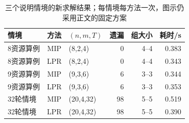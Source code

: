 \begin{table}[htbp]
\centering\small
\caption{三个说明情境的新求解结果；每情境每方法一次，图示仍采用正文的固定方案}\label{tab:special-timing}
\begin{tabular}{lclrrr}\toprule
情境 & 方法 & $(n,m,T)$ & 遗漏 & 组大小 & 耗时/s \\\midrule
8资源算例 & MIP & (8,2,4) & 0 & 4--4 & 0.383 \\
8资源算例 & LPR & (8,2,4) & 0 & 4--4 & 0.343 \\
9资源算例 & MIP & (9,3,6) & 6 & 3--3 & 0.344 \\
9资源算例 & LPR & (9,3,6) & 6 & 3--3 & 0.353 \\
32轮情境 & MIP & (20,4,32) & 98 & 5--5 & 0.519 \\
32轮情境 & LPR & (20,4,32) & 98 & 5--5 & 0.390 \\
\bottomrule\end{tabular}
\end{table}
